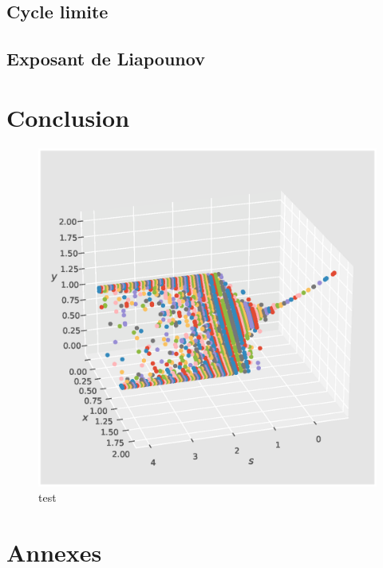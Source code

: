 \documentclass{wsdcr}
\begin{document}
\subsection{Cycle limite}
\subsection{Exposant de Liapounov}
\section{Conclusion}
\begin{figure}[t!]
    \centering
    \includegraphics[width=\linewidth]{fig/lv2_bif3D.eps}
    \caption{test}
    \label{fig:example}
\end{figure}

\section{Annexes}
\end{document}
